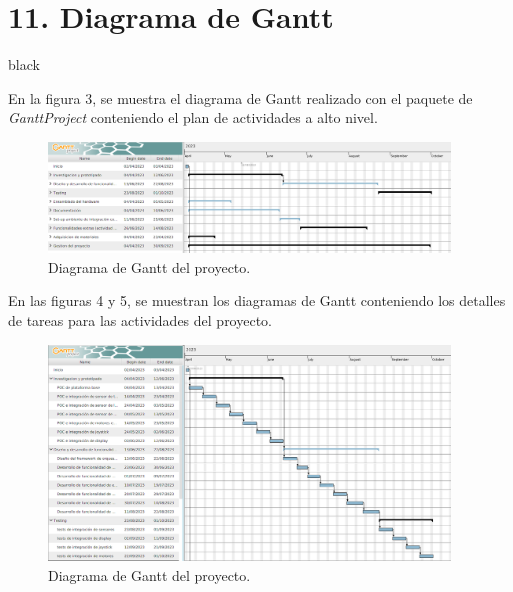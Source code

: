 \documentclass[
11pt, %
]{charter}
\begin{document}
\section{11. Diagrama de Gantt}
\label{sec:gantt}

\begin{consigna}{black}

En la figura 3, se muestra el diagrama de Gantt realizado con el paquete de \textit{GanttProject} conteniendo el plan de actividades a alto nivel. 


\begin{figure}[htpb]
\centering 
\includegraphics[width=0.95\textwidth]{./Figuras/gantt-part-0.png}
\caption{Diagrama de Gantt del proyecto.}
\label{fig:diagGantt}
\end{figure}

En las figuras 4 y 5, se muestran los diagramas de Gantt conteniendo los detalles de tareas para las actividades del proyecto.
 
\begin{figure}[htpb]
\centering 
\includegraphics[width=0.95\textwidth]{./Figuras/gantt-part-1.png}
\caption{Diagrama de Gantt del proyecto.}
\label{fig:diagGantt}
\end{figure}


\end{consigna}
\end{document}
